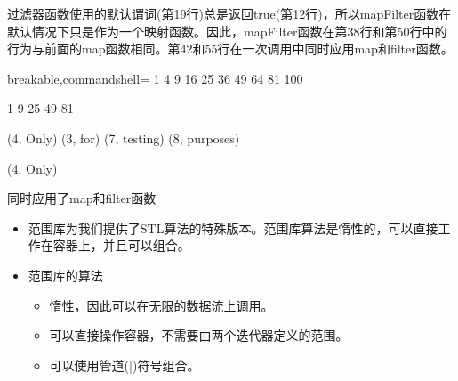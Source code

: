过滤器函数使用的默认谓词(第19行)总是返回true(第12行)，所以mapFilter函数在默认情况下只是作为一个映射函数。因此，mapFilter函数在第38行和第50行中的行为与前面的map函数相同。第42和55行在一次调用中同时应用map和filter函数。

\begin{tcblisting}{breakable,commandshell={}}
1 4 9 16 25 36 49 64 81 100

1 9 25 49 81

(4, Only) (3, for) (7, testing) (8, purposes)

(4, Only)
\end{tcblisting}

\begin{center}
同时应用了map和filter函数
\end{center}

\begin{tcolorbox}[breakable,enhanced jigsaw,colback=mygreen!5!white,colframe=mygreen!75!black,title={总结}]
\begin{itemize}
\item 
范围库为我们提供了STL算法的特殊版本。范围库算法是惰性的，可以直接工作在容器上，并且可以组合。

\item 
范围库的算法
\begin{itemize}
\item 
惰性，因此可以在无限的数据流上调用。

\item 
可以直接操作容器，不需要由两个迭代器定义的范围。

\item 
可以使用管道(|)符号组合。
\end{itemize}
\end{itemize}
\end{tcolorbox}	
	
\newpage
	
	
	
	
	
	
	
	
	
	
	
	
	
	
	
	
	
	
	
	
	